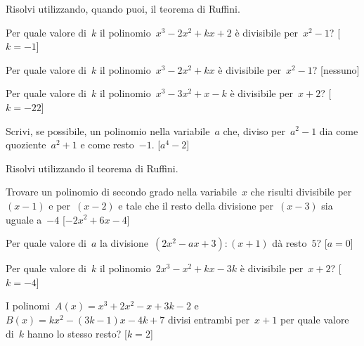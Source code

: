 \begin{esercizio}[\Ast]
\label{ese:div.006}
Risolvi utilizzando, quando puoi, il teorema di Ruffini.
 \begin{enumeratea}
 \item Per quale valore di~\(k\) il polinomio~\(x^{3}-2x^{2}+kx+2\) 
  è divisibile per~\(x^{2}-1\)? \hfill[\(k=-1\)]
 \item Per quale valore di~\(k\) il polinomio~\(x^{3}-2x^{2}+kx\) 
  è divisibile per~\(x^{2}-1\)? \hfill[nessuno]
 \item Per quale valore di~\(k\) il polinomio~\(x^{3}-3x^{2}+x-k\) 
  è divisibile per~\(x+2\)? \hfill[\(k=-22\)]
 \item Scrivi, se possibile, un polinomio nella variabile~\(a\) che, 
  diviso per~\(a^{2}-1\) dia come quoziente~\(a^{2}+1\) e 
  come resto~\(-1\). \hfill \mbox{[\(a^{4}-2\)]} %
 \end{enumeratea}
\end{esercizio}

\begin{esercizio}[\Ast]
\label{ese:div.007}
Risolvi utilizzando il teorema di Ruffini.
 \begin{enumeratea}
 \item Trovare un polinomio di secondo grado nella variabile~\(x\) che risulti 
  divisibile per~\((x-1)\) e per~\((x-2)\) e tale che il resto della divisione 
  per~\((x-3)\) sia uguale a~\(-4\) \hfill[\(-2x^2+6x-4\)]
 \item Per quale valore di~\(a\) la 
  divisione~\(\left(2x^{2}-ax+3\right):(x+1)\) dà resto~\(5\)? \hfill[\(a=0\)]
 \item Per quale valore di~\(k\) il 
  polinomio~\(2x^{3}-x^{2}+kx-3k\) è divisibile per~\(x+2\)? \hfill[\(k=-4\)]
 \item I polinomi~\(A(x)=x^3+2x^2-x+3k-2\) e~\(B(x)=kx^2-(3k-1)x-4k+7\) 
  divisi entrambi per~\(x+1\) per quale valore di~\(k\) hanno lo stesso resto? 
  \hfill[\(k=2\)]
 \end{enumeratea}
\end{esercizio}

\subsubsection*{}

